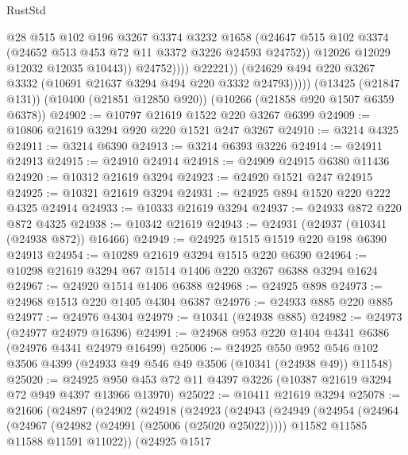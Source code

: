 \begin{lexlean}{RustStd}
\begin{coremodule}
{\begin{coremodule}
{{{{{{{{{{{{{{{{{{{{{{{{{                          @28
                          @515
                          @102
                          @196
                          @3267
                          @3374
                          @3232
                          @1658
                          (@24647
                            @515
                            @102
                            @3374
                            (@24652 @513 @453 @72 @11 @3372 @3226 @24593 @24752))
                          @12026
                          @12029
                          @12032
                          @12035
                          @10443))
                      @24752))))
              @22221))
          (@24629 @494 @220 @3267 @3332 (@10691 @21637 @3294 @494 @220 @3332 @24793)))))
    (@13425 (@21847 @131))
    (@10400 (@21851 @12850 @920))
    (@10266 (@21858 @920 @1507 @6359 @6378))
@24902 := @10797 @21619 @1522 @220 @3267 @6399
@24909 := @10806 @21619 @3294 @920 @220 @1521 @247 @3267
@24910 := @3214 @4325
@24911 := @3214 @6390
@24913 := @3214 @6393 @3226
@24914 := @24911 @24913
@24915 := @24910 @24914
@24918 := @24909 @24915 @6380 @11436
@24920 := @10312 @21619 @3294
@24923 := @24920 @1521 @247 @24915
@24925 := @10321 @21619 @3294
@24931 := @24925 @894 @1520 @220 @222 @4325 @24914
@24933 := @10333 @21619 @3294
@24937 := @24933 @872 @220 @872 @4325
@24938 := @10342 @21619
@24943 := @24931 (@24937 (@10341 (@24938 @872)) @16466)
@24949 := @24925 @1515 @1519 @220 @198 @6390 @24913
@24954 := @10289 @21619 @3294 @1515 @220 @6390
@24964 := @10298 @21619 @3294 @67 @1514 @1406 @220 @3267 @6388 @3294 @1624
@24967 := @24920 @1514 @1406 @6388
@24968 := @24925 @898
@24973 := @24968 @1513 @220 @1405 @4304 @6387
@24976 := @24933 @885 @220 @885
@24977 := @24976 @4304
@24979 := @10341 (@24938 @885)
@24982 := @24973 (@24977 @24979 @16396)
@24991 := @24968 @953 @220 @1404 @4341 @6386 (@24976 @4341 @24979 @16499)
@25006 := @24925
    @550
    @952
    @546
    @102
    @3506
    @4399
    (@24933 @49 @546 @49 @3506 (@10341 (@24938 @49)) @11548)
@25020 := @24925 @950 @453 @72 @11 @4397 @3226 (@10387 @21619 @3294 @72 @949 @4397 @13966 @13970)
@25022 := @10411 @21619 @3294
@25078 := @21606
    (@24897
      (@24902
        (@24918
          (@24923
            (@24943
              (@24949
                (@24954
                  (@24964
                    (@24967 (@24982 (@24991 (@25006 (@25020 @25022)))))
                    @11582
                    @11585
                    @11588
                    @11591
                    @11022))
                (@24925
                  @1517
}}}}}}}}}}}}}}}}}}}}}}}}}
\end{coremodule}}
\end{coremodule}
\end{lexlean}

